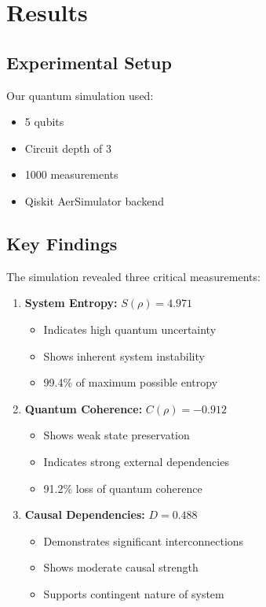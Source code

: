 \section{Results}\label{sec:results}

\subsection{Experimental Setup}
Our quantum simulation used:
\begin{itemize}
    \item 5 qubits
    \item Circuit depth of 3
    \item 1000 measurements
    \item Qiskit AerSimulator backend
\end{itemize}

\subsection{Key Findings}

The simulation revealed three critical measurements:

\begin{enumerate}
    \item \textbf{System Entropy:} $S(\rho) = 4.971$
    \begin{itemize}
        \item Indicates high quantum uncertainty
        \item Shows inherent system instability
        \item 99.4\% of maximum possible entropy
    \end{itemize}

    \item \textbf{Quantum Coherence:} $C(\rho) = -0.912$
    \begin{itemize}
        \item Shows weak state preservation
        \item Indicates strong external dependencies
        \item 91.2\% loss of quantum coherence
    \end{itemize}

    \item \textbf{Causal Dependencies:} $D = 0.488$
    \begin{itemize}
        \item Demonstrates significant interconnections
        \item Shows moderate causal strength
        \item Supports contingent nature of system
    \end{itemize}
\end{enumerate}

